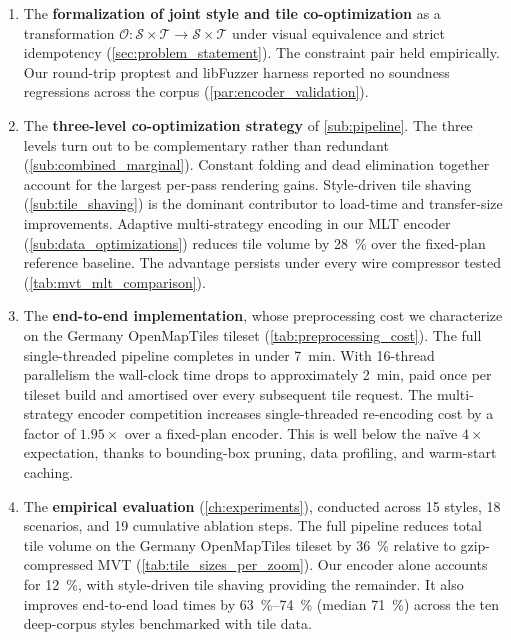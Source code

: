 \begin{enumerate}[label=\textbf{C\arabic*}]
    \item The \textbf{formalization of joint style and tile co-optimization} as a transformation $\mathcal{O}: \mathcal{S} \times \mathcal{T} \to \mathcal{S} \times \mathcal{T}$ under visual equivalence and strict idempotency (\cref{sec:problem_statement}).
    The constraint pair held empirically.
    Our round-trip proptest and libFuzzer harness reported no soundness regressions across the corpus (\cref{par:encoder_validation}).

    \item The \textbf{three-level co-optimization strategy} of \cref{sub:pipeline}.
    The three levels turn out to be complementary rather than redundant (\cref{sub:combined_marginal}).
    Constant folding and dead elimination together account for the largest per-pass rendering gains.
    Style-driven tile shaving (\cref{sub:tile_shaving}) is the dominant contributor to load-time and transfer-size improvements.
    Adaptive multi-strategy encoding in our \ac{MLT} encoder (\cref{sub:data_optimizations}) reduces tile volume by \qty{28}{\percent} over the fixed-plan reference baseline.
    The advantage persists under every wire compressor tested (\cref{tab:mvt_mlt_comparison}).

    \item The \textbf{end-to-end implementation}, whose preprocessing cost we characterize on the Germany OpenMapTiles tileset (\cref{tab:preprocessing_cost}).
    The full single-threaded pipeline completes in under \qty{7}{\minute}.
    With 16-thread parallelism the wall-clock time drops to approximately \qty{2}{\minute}, paid once per tileset build and amortised over every subsequent tile request.
    The multi-strategy encoder competition increases single-threaded re-encoding cost by a factor of $1.95\times$ over a fixed-plan encoder.
    This is well below the naïve $4\times$ expectation, thanks to bounding-box pruning, data profiling, and warm-start caching.

    \item The \textbf{empirical evaluation} (\cref{ch:experiments}), conducted across 15 styles, 18 scenarios, and 19 cumulative ablation steps.
    The full pipeline reduces total tile volume on the Germany OpenMapTiles tileset by \qty{36}{\percent} relative to gzip-compressed \ac{MVT} (\cref{tab:tile_sizes_per_zoom}).
    Our encoder alone accounts for \qty{12}{\percent}, with style-driven tile shaving providing the remainder.
    It also improves end-to-end load times by \qtyrange{63}{74}{\percent} (median \qty{71}{\percent}) across the ten deep-corpus styles benchmarked with tile data.
\end{enumerate}

